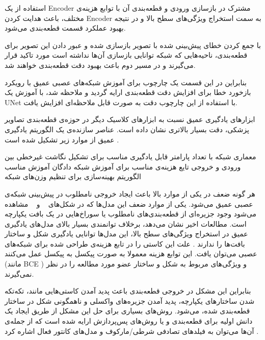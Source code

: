  استفاده از یک Encoder مشترک در بازسازی ورودی و قطعه‌بندی آن با توابع هزینه‌ی مختلف، باعث هدایت کردن Encoder به سمت استخراج ویژگی‌های سطح بالا و در نتیجه بهبود عملکرد قسمت‌ قطعه‌بندی می‌شود.

 با جمع کردن خطای پیش‌بینی شده با تصویر بازسازی شده و عبور دادن این تصویر برای قطعه‌بندی، ناحیه‌هایی که شبکه توانایی بازسازی آن‌ها نداشته است مورد تاکید قرار می‌گیرند و در مسیر دوم باعث بهبود دقت قطعه‌بندی خواهند شد.

بنابراین در این قسمت یک چارچوب برای آموزش شبکه‌های عصبی عمیق با رویکرد بازخورد خطا برای افزایش دقت قطعه‌بندی ارایه گردید و ملاحظه شد، با آموزش یک UNet با استفاده از این چارچوب دقت به صورت قابل ملاحظه‌ای افزایش یافت.

ابزارهای یادگیری عمیق نسبت به ابزارهای کلاسیک دیگر در حوزه‌ی قطعه‌بندی تصاویر پزشکی، دقت بسیار بالاتری نشان داده است. عناصر سازنده‌ی یک الگوریتم یادگیری عمیق از موارد زیر تشکیل شده است .

 معماری شبکه با تعداد پارامتر قابل یادگیری مناسب برای تشکیل نگاشت غیرخطی بین ورودی و خروجی
 تایع هزینه‌ی مناسب برای آموزش شبکه
 دادگان آموزش مناسب 
 الگوریتم بهینه‌سازی برای تنظیم وزن‌های شبکه

هر گونه ضعف در یکی از موارد بالا باعث ایجاد خروجی نامطلوب در پیش‌بینی شبکه‌ی عصبی عمیق می‌شود. یکی از موارد ضعف این مدل‌ها که در شکل‌های ~ و ~ مشاهده می‌شود وجود جزیره‌ای‌ از قطعه‌بندی‌های نامطلوب یا سوراخ‌هایی در یک بافت یکپارچه است. مطالعات اخیر نشان می‌دهد، برخلاف توانمندی بسیار بالای مدل‌های یادگیری عمیق در استخراج ویژگی‌های سطح بالا، این مدل‌ها توانایی یادگیری شکل و ساختار بافت‌ها را ندارند . علت این کاستی را در تابع هزینه‌ی طراحی شده برای شبکه‌های عصبی می‌توان یافت. این توابع هزینه معمولا به صورت پیکسل به پیکسل عمل می‌کنند (مانند BCE ) و ویژگی‌های مربوط به شکل و ساختار عضو مورد مطالعه را در نظر نمی‌گیرند.

بنابراین این مشکل در خروجی قطعه‌بندی باعث پدید آمدن کاستی‌هایی مانند، تکه‌تکه شدن ساختارهای یکپارچه، پدید آمدن جزیره‌های واکسلی و ناهمگونی شکل در ساختار قطعه‌بندی شده، می‌شود. روش‌های بسیاری برای حل این مشکل از طریق ایجاد یک دانش اولیه برای قطعه‌بندی و یا روش‌های پس‌پردازش ارایه شده است که از جمله‌ی آن‌ها می‌توان به فیلد‌های تصادفی شرطی/مارکوف و مدل‌های کانتور فعال اشاره کرد .

